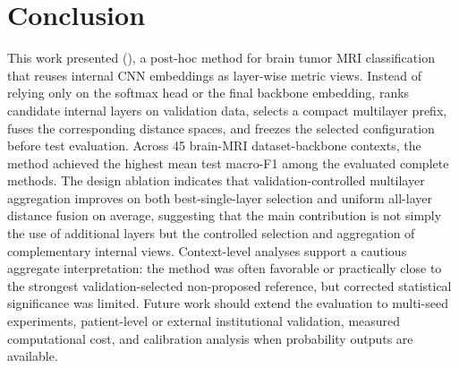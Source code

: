 \documentclass[main.tex]{subfiles}
\begin{document}
\section{Conclusion}
\label{sec:conclusion}

This work presented \fullmethod{} (\method{}), a post-hoc method for brain tumor MRI classification that reuses internal CNN embeddings as layer-wise metric views. Instead of relying only on the softmax head or the final backbone embedding, \method{} ranks candidate internal layers on validation data, selects a compact multilayer prefix, fuses the corresponding distance spaces, and freezes the selected configuration before test evaluation. Across 45 brain-MRI dataset-backbone contexts, the method achieved the highest mean test macro-F1 among the evaluated complete methods. The design ablation indicates that validation-controlled multilayer aggregation improves on both best-single-layer selection and uniform all-layer distance fusion on average, suggesting that the main contribution is not simply the use of additional layers but the controlled selection and aggregation of complementary internal views. Context-level analyses support a cautious aggregate interpretation: the method was often favorable or practically close to the strongest validation-selected non-proposed reference, but corrected statistical significance was limited. Future work should extend the evaluation to multi-seed experiments, patient-level or external institutional validation, measured computational cost, and calibration analysis when probability outputs are available.
\end{document}
